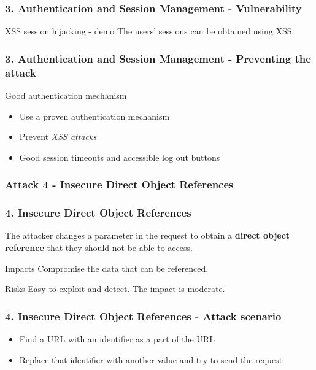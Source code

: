 \begin{frame}
\frametitle{3. Authentication and Session Management - Vulnerability}
\begin{exampleblock}{XSS session hijacking - demo}
The users' sessions can be obtained using XSS.
\end{exampleblock}
\end{frame}

\begin{frame}
\frametitle{3. Authentication and Session Management - Preventing the attack}
\begin{block}{Good authentication mechanism}
\begin{itemize}
\item Use a proven authentication mechanism
\item Prevent \emph{XSS attacks}
\item Good session timeouts and accessible log out buttons
\end{itemize}
\end{block}
\end{frame}

\subsubsection{Attack 4 - Insecure Direct Object References}

\begin{frame}
\frametitle{4. Insecure Direct Object References}
The attacker changes a parameter in the request to obtain a \textbf{direct
object reference} that they should not be able to access.
\begin{block}{Impacts}
Compromise the data that can be referenced.
\end{block}
\begin{block}{Risks}
\alert{Easy} to exploit and detect. The impact is moderate.
\end{block}
\end{frame}

\begin{frame}
\frametitle{4. Insecure Direct Object References - Attack scenario}
\begin{itemize}
\item Find a URL with an identifier as a part of the URL
\item Replace that identifier with another value and try to send the request
\end{itemize}
\end{frame}

